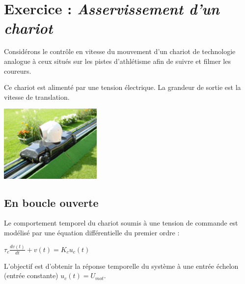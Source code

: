 \documentclass[10pt]{article}
\begin{document}



 \renewcommand{\baselinestretch}{1}
\setlength{\parskip}{0ex plus 0.5ex minus 0.2ex}

\section{Exercice : {\it Asservissement d'un chariot}}

\begin{minipage}[c]{0.6\linewidth}
Consid\'erons le contr\^ole en vitesse du mouvement d'un chariot de technologie analogue \`a ceux situ\'es sur les pistes d'athl\'etisme afin de suivre et filmer les coureurs.

\bigskip

Ce chariot est aliment\'e par une tension \'electrique. La grandeur de sortie est la vitesse de translation.



\end{minipage} \hfill
\begin{minipage}[c]{0.3\linewidth}
\includegraphics[width=5cm]{images/camera.jpg}
\end{minipage}





\subsection{En boucle ouverte}
Le comportement temporel  du chariot soumis \`a une tension de commande est mod\'elis\'e par une \'equation diff\'erentielle du premier ordre :

\begin{center}
$\tau_c \frac{d v(t)}{dt} + v(t)= K_c u_c(t)$
\end{center}

L'objectif est d'obtenir la r\'eponse temporelle du syst\`eme \`a une entr\'ee \'echelon (entr\'ee constante) $u_c(t)=U_{mot}$.
\end{document}

